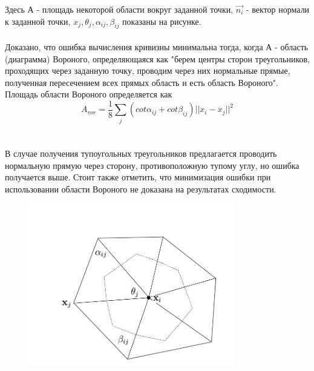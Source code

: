\documentclass[12pt,a4paper, titlepage]{article}
\begin{document}
Здесь А - площадь некоторой области вокруг заданной точки, $\vec{n_i}$ - вектор нормали к заданной точки, $x_j, \theta_j, \alpha_{ij}, \beta_{ij}$ показаны на рисунке.
\\
\\
Доказано, что ошибка вычисления кривизны минимальна тогда, когда А - область (диаграмма) Вороного, определяющаяся как "берем центры сторон треугольников, проходящих через заданную точку, проводим через них нормальные прямые, полученная пересечением всех прямых область и есть область Вороного". Площадь области Вороного определяется как
\begin{equation}
A_{vor} = \frac{1}{8}\sum_j{(cot \alpha_{ij} + cot \beta_{ij})}||x_i - x_j||^2
\end{equation}
\\
\\
В случае получения тупоугольных треугольников предлагается проводить нормальную прямую через сторону, противоположную тупому углу, но ошибка получается выше. Стоит также отметить, что минимизация ошибки при использовании области Вороного не доказана на результатах сходимости.

\begin{figure}[H]
	\centering
	\includegraphics[width = 0.8\textwidth]{1.png}
\end{figure}
\end{document}
